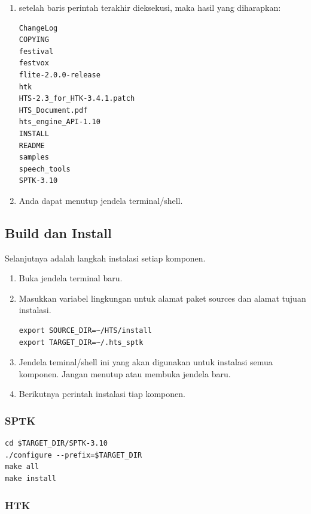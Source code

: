 \documentclass[12pt,]{article}
\begin{document}
\begin{enumerate}
		\newpage
		\item setelah baris perintah terakhir dieksekusi, maka hasil yang diharapkan:
		\begin{verbatim}
ChangeLog
COPYING
festival
festvox
flite-2.0.0-release
htk
HTS-2.3_for_HTK-3.4.1.patch
HTS_Document.pdf
hts_engine_API-1.10
INSTALL
README
samples
speech_tools
SPTK-3.10
		\end{verbatim}
		
		\item Anda dapat menutup jendela terminal/shell.
		
	\end{enumerate}

	\subsection{Build dan Install}
	
	Selanjutnya adalah langkah instalasi setiap komponen.
	
	\begin{enumerate}
		\item Buka jendela terminal baru.
		
		\item Masukkan variabel lingkungan untuk alamat paket sources dan alamat tujuan instalasi.
		\begin{verbatim}
export SOURCE_DIR=~/HTS/install
export TARGET_DIR=~/.hts_sptk
		\end{verbatim}
		
		\item Jendela teminal/shell ini yang akan digunakan untuk instalasi semua komponen.
		Jangan menutup atau membuka jendela baru.
		
		\item Berikutnya perintah instalasi tiap komponen.
	\end{enumerate}

	\subsubsection{SPTK}
	\begin{verbatim}
cd $TARGET_DIR/SPTK-3.10
./configure --prefix=$TARGET_DIR
make all
make install
	\end{verbatim}
	
	\subsubsection{HTK}
	
\end{document}
